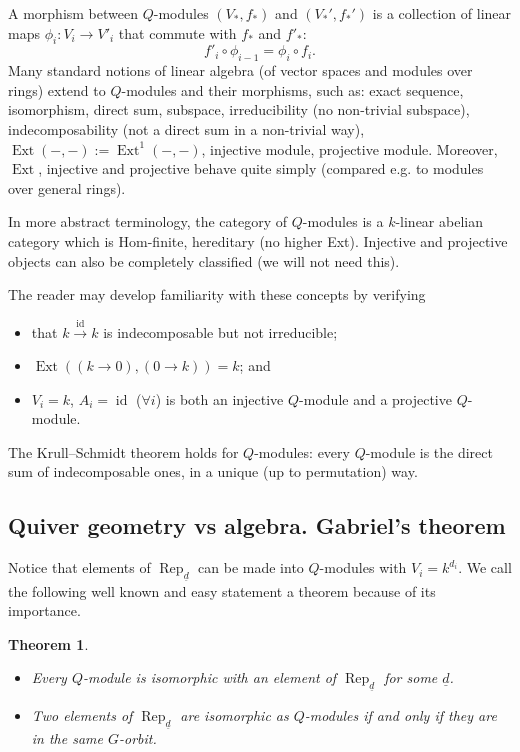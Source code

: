 \documentclass[a4paper]{amsart}
\DeclareMathOperator{\id}{id}
\DeclareMathOperator{\Ext}{Ext}
\DeclareMathOperator{\Rep}{\mathrm{Rep}}
\newcommand{\ud}{\underline{d}}
\newtheorem{thm}{Theorem}[section]
\theoremstyle{plain}
\begin{document}
A morphism between $Q$-modules $(V_*,f_*)$ and $(V_*',f_*')$ is a collection of linear maps $\phi_i:V_i\to V'_i$ that commute with $f_*$ and $f'_*$:
\[
f'_i \circ \phi_{i-1}= \phi_i \circ f_i.
\]
Many standard notions of linear algebra (of vector spaces and modules over rings) extend to $Q$-modules and their morphisms, such as: exact sequence, isomorphism, direct sum, subspace, irreducibility (no non-trivial subspace), indecomposability (not a direct sum in a non-trivial way), $\Ext(-,-):=\Ext^1(-,-)$, injective module, projective module. Moreover, $\Ext$, injective and projective behave quite simply (compared e.g. to modules over general rings). 

In more abstract terminology, the category of $Q$-modules is a $k$-linear abelian category which is Hom-finite, hereditary (no higher Ext). Injective and projective objects can also be completely classified (we will not need this).

The reader may develop familiarity  with these concepts by verifying
\begin{itemize}
    \item that $k \xrightarrow{\id} k$ is indecomposable but not irreducible; 
    \item $\Ext((k\to 0), (0\to k))=k$; and
    \item $V_i=k$, $A_i=\id$ ($\forall i$) is both an injective $Q$-module and a projective $Q$-module. 
\end{itemize}

The Krull–Schmidt theorem holds for $Q$-modules: every $Q$-module is the direct sum of indecomposable ones, in a unique (up to permutation) way. 

\subsection{Quiver geometry vs algebra. Gabriel's theorem}

Notice that elements of $\Rep_{\ud}$ can be made into $Q$-modules with $V_i=k^{d_i}$. We call the following well known and easy statement a theorem because of its importance.

\begin{thm} \label{thm:easy}
\ 
\begin{itemize}
    \item Every $Q$-module is isomorphic with an element of $\Rep_{\ud}$ for some $\ud$.
    \item Two elements of $\Rep_{\ud}$ are isomorphic as $Q$-modules if and only if they are in the same $G$-orbit.
\end{itemize}
\end{thm}
\end{document}
